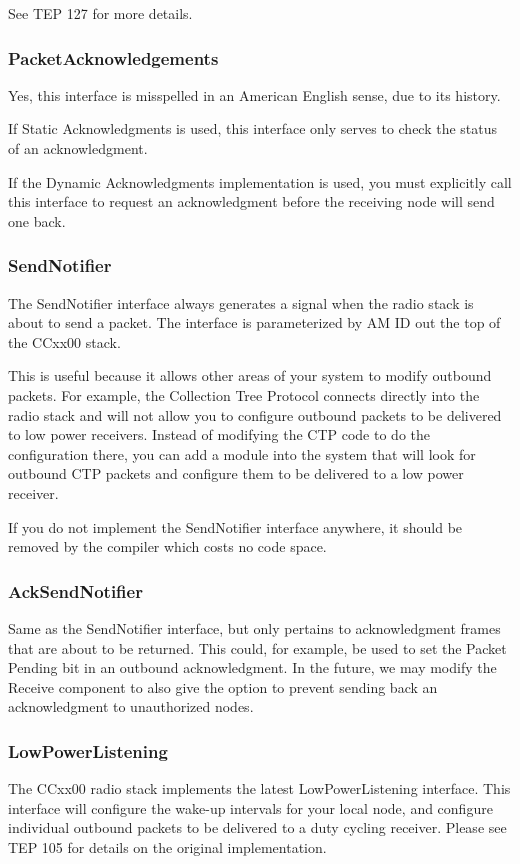 \documentclass{article}
\begin{document}
See TEP 127 \cite{tep127} for more details.

\subsubsection{PacketAcknowledgements}
Yes, this interface is misspelled in an American English sense, due to its history. 

If Static Acknowledgments is used, this interface only serves to check the status of
an acknowledgment.  

If the Dynamic Acknowledgments implementation is used, you must explicitly call this 
interface to request an acknowledgment before the receiving node will send one back.

\subsubsection{SendNotifier}
The SendNotifier interface always generates a signal when the radio stack is about to send
a packet. The interface is parameterized by AM ID out the top of the CCxx00 stack. 

This is useful because it allows other areas of your system to modify outbound packets. 
For example, the Collection Tree Protocol connects directly into the radio stack and will not allow you
to configure outbound packets to be delivered to low power receivers. Instead of modifying
the CTP code to do the configuration there, you can add a module into the system that will
look for outbound CTP packets and configure them to be delivered to a low power receiver.

If you do not implement the SendNotifier interface anywhere, it should be removed by the
compiler which costs no code space.

\subsubsection{AckSendNotifier}
Same as the SendNotifier interface, but only pertains to acknowledgment frames that are 
about to be returned. This could, for example, be used to set the Packet Pending bit
in an outbound acknowledgment. In the future, we may modify the Receive component to
also give the option to prevent sending back an acknowledgment to unauthorized nodes.

\subsubsection{LowPowerListening}
The CCxx00 radio stack implements the latest LowPowerListening interface. This interface
will configure the wake-up intervals for your local node, and configure individual outbound packets
to be delivered to a duty cycling receiver. Please see TEP 105 \cite{tep105} for details on the original implementation. 
\end{document}
